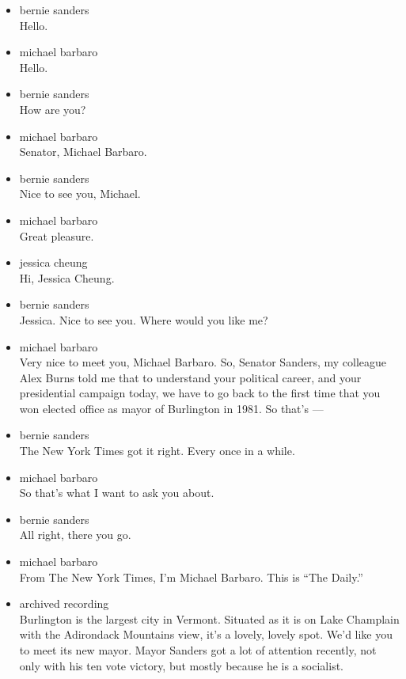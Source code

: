 \begin{itemize}
\item
  bernie sanders\\
  Hello.
\item
  michael barbaro\\
  Hello.
\item
  bernie sanders\\
  How are you?
\item
  michael barbaro\\
  Senator, Michael Barbaro.
\item
  bernie sanders\\
  Nice to see you, Michael.
\item
  michael barbaro\\
  Great pleasure.
\item
  jessica cheung\\
  Hi, Jessica Cheung.
\item
  bernie sanders\\
  Jessica. Nice to see you. Where would you like me?
\item
  michael barbaro\\
  Very nice to meet you, Michael Barbaro. So, Senator Sanders, my
  colleague Alex Burns told me that to understand your political career,
  and your presidential campaign today, we have to go back to the first
  time that you won elected office as mayor of Burlington in 1981. So
  that's ---
\item
  bernie sanders\\
  The New York Times got it right. Every once in a while.
\item
  michael barbaro\\
  So that's what I want to ask you about.
\item
  bernie sanders\\
  All right, there you go.
\item
  michael barbaro\\
  From The New York Times, I'm Michael Barbaro. This is ``The Daily.''
\item
  archived recording\\
  Burlington is the largest city in Vermont. Situated as it is on Lake
  Champlain with the Adirondack Mountains view, it's a lovely, lovely
  spot. We'd like you to meet its new mayor. Mayor Sanders got a lot of
  attention recently, not only with his ten vote victory, but mostly
  because he is a socialist.
\end{itemize}

